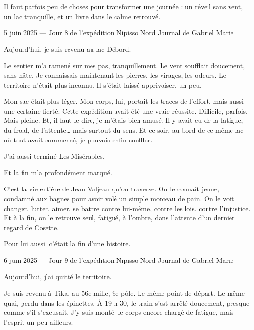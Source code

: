 Il faut parfois peu de choses pour transformer une journée : un réveil sans vent, un lac tranquille, et un livre dans le calme retrouvé.









5 juin 2025 — Jour 8 de l’expédition Nipisso Nord
Journal de Gabriel Marie

Aujourd’hui, je suis revenu au lac Débord.

Le sentier m’a ramené sur mes pas, tranquillement. Le vent soufflait doucement, sans hâte. Je connaissais maintenant les pierres, les virages, les odeurs. Le territoire n’était plus inconnu. Il s’était laissé apprivoiser, un peu.

Mon sac était plus léger. Mon corps, lui, portait les traces de l’effort, mais aussi une certaine fierté. Cette expédition avait été une vraie réussite. Difficile, parfois. Mais pleine. Et, il faut le dire, je m’étais bien amusé. Il y avait eu de la fatigue, du froid, de l’attente… mais surtout du sens. Et ce soir, au bord de ce même lac où tout avait commencé, je pouvais enfin souffler.

J’ai aussi terminé Les Misérables.

Et la fin m’a profondément marqué.

C’est la vie entière de Jean Valjean qu’on traverse. On le connaît jeune, condamné aux bagnes pour avoir volé un simple morceau de pain. On le voit changer, lutter, aimer, se battre contre lui-même, contre les lois, contre l’injustice. Et à la fin, on le retrouve seul, fatigué, à l’ombre, dans l’attente d’un dernier regard de Cosette.

Pour lui aussi, c’était la fin d’une histoire.













6 juin 2025 — Jour 9 de l’expédition Nipisso Nord
Journal de Gabriel Marie

Aujourd’hui, j’ai quitté le territoire.

Je suis revenu à Tika, au 56e mille, 9e pôle. Le même point de départ. Le même quai, perdu dans les épinettes. À 19 h 30, le train s’est arrêté doucement, presque comme s’il s’excusait. J’y suis monté, le corps encore chargé de fatigue, mais l’esprit un peu ailleurs.

